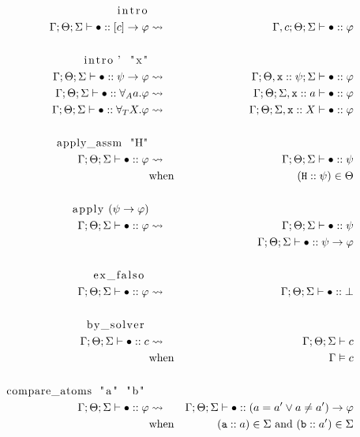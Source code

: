 \documentclass[english, mgr]{iithesis}
\begin{document}
\begin{eqnarray*}
  \text{\lstinline[columns=fixed]{intro}} & & \\
    \jgmnt[\Gamma; \Theta; \Sigma]{\hole\ofkind{\fCImp{\constr}{\formphi}}} & \leadsto & \jgmnt[\Gamma, \constr; \Theta; \Sigma]{\hole\ofkind\formphi} \\
  & & \\
  \text{\lstinline[columns=fixed]{intro' "x"}} & & \\
  \jgmnt[\Gamma; \Theta; \Sigma]{\hole\ofkind{\psi\fImp\formphi}} & \leadsto & \jgmnt[\Gamma; \Theta, \texttt{x} \ofkind\psi ; \Sigma]{\hole\ofkind\formphi} \\
  \jgmnt[\Gamma; \Theta; \Sigma]{\hole\ofkind{\fForallAtom{\atomv}{\formphi}}} & \leadsto & \jgmnt[\Gamma; \Theta; \Sigma, \texttt{x} \ofkind\atomv]{\hole\ofkind\formphi} \\
  \jgmnt[\Gamma; \Theta; \Sigma]{\hole\ofkind{\fForallTerm{\termv}{\formphi}}} & \leadsto & \jgmnt[\Gamma; \Theta; \Sigma, \texttt{x} \ofkind\termv]{\hole\ofkind\formphi} \\
  & & \\
  \text{\lstinline[columns=fixed]{apply_assm "H"}} & & \\
    \jgmnt[\Gamma; \Theta; \Sigma]{\hole\ofkind{{\formphi}}} & \leadsto & \jgmnt[\Gamma; \Theta; \Sigma]{\hole\ofkind\psi} \\
   & \text{when} & (\texttt{H} \ofkind \psi) \in \Theta \\
  & & \\
  \text{\lstinline[columns=fixed]{apply} } (\psi \fImp \formphi)& & \\
  \jgmnt[\Gamma; \Theta; \Sigma]{\hole\ofkind{{\formphi}}} & \leadsto & \jgmnt[\Gamma; \Theta; \Sigma]{\hole\ofkind\psi} \\
  &          & \jgmnt[\Gamma; \Theta; \Sigma]{\hole\ofkind\psi \fImp \formphi} \\
  & & \\
  \text{\lstinline[columns=fixed]{ex_falso} } & & \\
  \jgmnt[\Gamma; \Theta; \Sigma]{\hole\ofkind{{\formphi}}} & \leadsto & \jgmnt[\Gamma; \Theta; \Sigma]{\hole\ofkind\bot} \\
  & & \\
  \text{\lstinline[columns=fixed]{by_solver} }& & \\
  \jgmnt[\Gamma; \Theta; \Sigma]{\hole\ofkind{{\constr}}} & \leadsto & \jgmnt[\Gamma; \Theta; \Sigma]{\constr} \\
   & \text{when} & \cjgmnt[\Gamma]{\constr}\\
  & & \\
  \text{\lstinline[columns=fixed]{compare_atoms "a" "b"} }& & \\
  \jgmnt[\Gamma; \Theta; \Sigma]{\hole\ofkind{{\formphi}}} & \leadsto & \jgmnt[\Gamma; \Theta; \Sigma]{\hole\ofkind{(\atomv \ceq \atomv'\vee\atomv \cneq \atomv')\fImp{\formphi}}} \\
   & \text{when} & (\texttt{a} \ofkind \atomv) \in \Sigma \text{ and } (\texttt{b} \ofkind \atomv') \in \Sigma\\
\end{eqnarray*}
\end{document}
